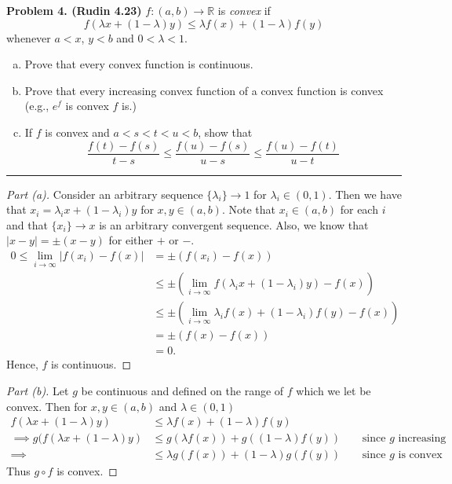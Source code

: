 \documentclass[leqno]{article}
\theoremstyle{nonumberplain}
\newtheorem{proof}{Proof}
\begin{document}


\noindent\textbf{Problem 4. (Rudin 4.23)} $f\colon (a,b) \to \mathbb{R}$ is \emph{convex} if
\[
f(\lambda x + (1-\lambda)y)\leq \lambda f(x)+(1-\lambda)f(y)
\]
whenever $a<x$, $y<b$ and $0<\lambda<1$.
\begin{enumerate}[(a)]
\item Prove that every convex function is continuous.
\item Prove that every increasing convex function of a convex function is convex (e.g., $e^f$ is convex $f$ is.)
\item If $f$ is convex and $a<s<t<u<b$, show that
\[
\frac{f(t)-f(s)}{t-s}\le \frac{f(u)-f(s)}{u-s}\le \frac{f(u)-f(t)}{u-t}
\]
\end{enumerate}

\noindent\rule[0.5ex]{\linewidth}{1pt}

\begin{proof}[Part (a)]
Consider an arbitrary sequence $\{\lambda_i\}\to 1$ for $\lambda_i \in (0,1)$.  Then we have that $x_i=\lambda_i x + (1-\lambda_i)y$ for $x,y\in (a,b)$.  Note that $x_i \in (a,b)$ for each $i$ and that $\{x_i\}\to x$ is an arbitrary convergent sequence.  Also, we know that $|x-y|=\pm (x-y)$ for either $+$ or $-$.
\begin{align*}
0\leq \lim_{i\to \infty} |f(x_i)-f(x)|&=\pm (f(x_i)-f(x))\\
&\leq \pm (\lim_{i\to \infty} f(\lambda_i x + (1-\lambda_i)y)-f(x))\\
&\leq \pm (\lim_{i\to \infty} \lambda_i f(x)+(1-\lambda_i)f(y)-f(x))\\
&=\pm (f(x)-f(x))\\
&=0.
\end{align*}
Hence, $f$ is continuous.
\end{proof}

\begin{proof}[Part (b)]
Let $g$ be continuous and defined on the range of $f$ which we let be convex.  Then for $x,y\in (a,b)$ and $\lambda\in (0,1)$
\begin{align*}
f(\lambda x + (1-\lambda)y)&\leq \lambda f(x) +(1-\lambda) f(y)\\
\implies g(f(\lambda x + (1-\lambda)y)&\leq g(\lambda f(x))+g((1-\lambda)f(y)) \textrm{~~~~~ since $g$ increasing}\\
\implies &\leq \lambda g(f(x))+(1-\lambda) g(f(y)) \textrm{~~~~~ since $g$ is convex}
\end{align*}
Thus $g\circ f$ is convex.
\end{proof}
\end{document}
